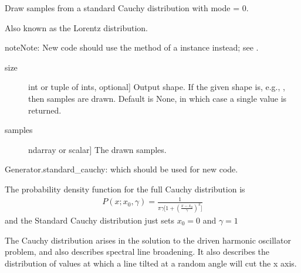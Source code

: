 \documentclass[letterpaper,10pt,english]{sphinxmanual}
\begin{document}

\begin{fulllineitems}
\label{\detokenize{infrapy.utils:infrapy.utils.ref2sac.standard_cauchy}}
Draw samples from a standard Cauchy distribution with mode = 0.

Also known as the Lorentz distribution.

\begin{sphinxadmonition}{note}{Note:}
New code should use the  method of a 
instance instead; see .
\end{sphinxadmonition}
\begin{description}
\item[{size}] \leavevmode{[}int or tuple of ints, optional{]}
Output shape.  If the given shape is, e.g., , then
 samples are drawn.  Default is None, in which case a
single value is returned.

\end{description}
\begin{description}
\item[{samples}] \leavevmode{[}ndarray or scalar{]}
The drawn samples.

\end{description}

Generator.standard\_cauchy: which should be used for new code.

The probability density function for the full Cauchy distribution is
\begin{equation*}
\begin{split}P(x; x_0, \gamma) = \frac{1}{\pi \gamma \bigl[ 1+
(\frac{x-x_0}{\gamma})^2 \bigr] }\end{split}
\end{equation*}
and the Standard Cauchy distribution just sets \(x_0=0\) and
\(\gamma=1\)

The Cauchy distribution arises in the solution to the driven harmonic
oscillator problem, and also describes spectral line broadening. It
also describes the distribution of values at which a line tilted at
a random angle will cut the x axis.


\end{fulllineitems}
\end{document}
